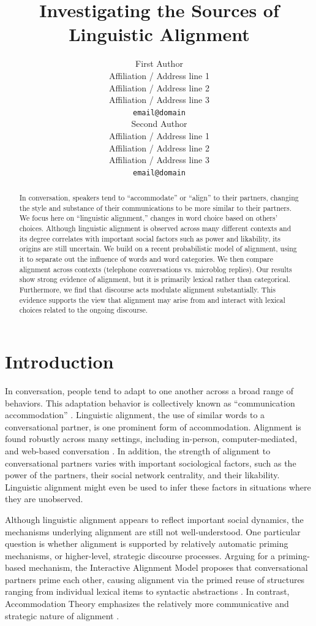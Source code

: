 \documentclass[11pt]{article}
\title{Investigating the Sources of Linguistic Alignment}
\author{First Author \\
  Affiliation / Address line 1 \\
  Affiliation / Address line 2 \\
  Affiliation / Address line 3 \\
  {\tt email@domain} \\\And
  Second Author \\
  Affiliation / Address line 1 \\
  Affiliation / Address line 2 \\
  Affiliation / Address line 3 \\
  {\tt email@domain} \\}
\date{}
\begin{document}
\maketitle

\begin{abstract}
In conversation, speakers tend to ``accommodate'' or ``align'' to their partners, changing the style and substance of their communications to be more similar to their partners. We focus here on ``linguistic alignment,'' changes in word choice based on others' choices. Although linguistic alignment is observed across many different contexts and its degree correlates with important social factors such as power and likability, its origins are still uncertain.
We build on a recent probabilistic model of alignment, using it to separate out the influence of words and word categories. We then compare alignment across contexts (telephone conversations vs. microblog replies).
Our results show strong evidence of alignment, but it is primarily lexical rather than categorical. Furthermore, we find that discourse acts modulate alignment substantially. This evidence supports the view that alignment may arise from and interact with lexical choices related to the ongoing discourse.
\end{abstract}

\section{Introduction}

In conversation, people tend to adapt to one another across a broad range of behaviors. This adaptation behavior is collectively known as ``communication accommodation'' \cite{GilesCouplandCoupland1991}. Linguistic alignment, the use of similar words to a conversational partner, is one prominent form of accommodation. Alignment is found robustly across many settings, including in-person, computer-mediated, and web-based conversation \cite{DNMEtAl2012,GilesSchererTaylor1979,NiederhofferPennebaker2002}. In addition, the strength of alignment to conversational partners varies with important sociological factors, such as the power of the partners, their social network centrality, and their likability. Linguistic alignment might even be used to infer these factors in situations where they are unobserved.

Although linguistic alignment appears to reflect important social dynamics, the mechanisms underlying alignment are still not well-understood. One particular question is whether alignment is supported by relatively automatic priming mechanisms, or higher-level, strategic discourse processes. Arguing for a priming-based mechanism, the Interactive Alignment Model proposes that conversational partners prime each other, causing alignment via the primed reuse of structures ranging from individual lexical items to syntactic abstractions  \cite{PickeringGarrod2004}. In contrast, Accommodation Theory emphasizes the relatively more communicative and strategic nature of alignment \cite{GilesCouplandCoupland1991}.
\end{document}

